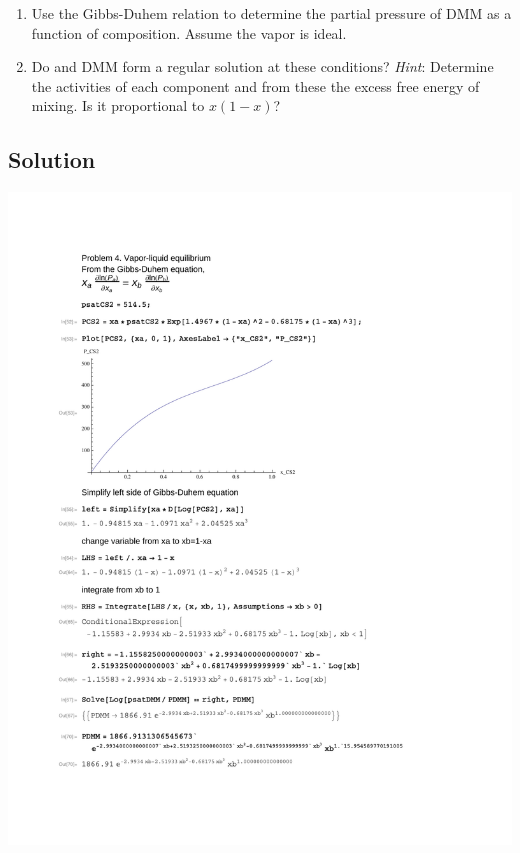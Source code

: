 \documentclass[11pt]{article}
\begin{document}
\begin{enumerate}
\item Use the Gibbs-Duhem relation to determine the partial pressure of DMM as a
function of composition.  Assume the vapor is ideal.
\item Do  and DMM form a regular solution at these conditions?  \emph{Hint}: Determine the activities of each component and from these the excess free energy of mixing.  Is it proportional to \(x(1-x)\)?
\end{enumerate}

\subsection{Solution}
\label{sec:orgca60c05}
\begin{center}
\includegraphics[width=.9\linewidth]{./HW8-Q4-soln.pdf}
\end{center}
\end{document}
